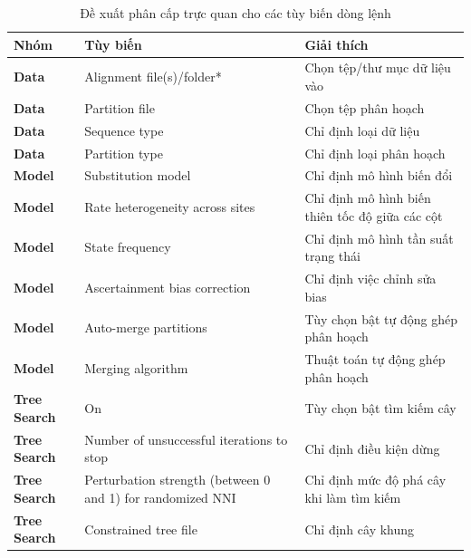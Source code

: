 \documentclass[12pt]{report}
\begin{document}
\begin{longtable}[c]{|p{2.5cm}|p{6.5cm}|p{6.5cm}|}
\caption{Đề xuất phân cấp trực quan cho các tùy biến dòng lệnh}
\label{tbl:table4.1}
\hline
\textbf{Nhóm} & \textbf{Tùy biến} & \textbf{Giải thích} \\
\endfirsthead
%
\endhead
%
\hline
		\textbf{Data}              & Alignment file(s)/folder*        &        Chọn tệp/thư mục dữ liệu vào                          \\ \hline
		\textbf{Data}             & Partition file     &            Chọn tệp phân hoạch             \\ \hline
		\textbf{Data}           & Sequence type    &            Chỉ định loại dữ liệu                      \\ \hline
		\textbf{Data}              & Partition type        &        Chỉ định loại phân hoạch                         \\ \hline
		\textbf{Model}             & Substitution model    &            Chỉ định mô hình biến đổi            \\ \hline
		\textbf{Model}           & Rate heterogeneity across sites   &            Chỉ định mô hình biến thiên tốc độ giữa các cột                     \\ \hline
		\textbf{Model}              & State frequency        &        Chỉ định mô hình tần suất trạng thái                      \\ \hline
		\textbf{Model}             & Ascertainment bias correction    &            Chỉ định việc chỉnh sửa bias            \\ \hline
		\textbf{Model}           & Auto-merge partitions   &            Tùy chọn bật tự động ghép phân hoạch                     \\ \hline
		\textbf{Model}              & Merging algorithm        &        Thuật toán tự động ghép phân hoạch                          \\ \hline
		\textbf{Tree Search}             & On    &            Tùy chọn bật tìm kiếm cây             \\ \hline
		\textbf{Tree Search}           & Number of unsuccessful iterations to stop    &            Chỉ định điều kiện dừng                      \\ \hline
		\textbf{Tree Search}              & Perturbation strength (between 0 and 1) for randomized NNI       &        Chỉ định mức độ phá cây khi làm tìm kiếm                          \\ \hline
		\textbf{Tree Search}             & Constrained tree file    &            Chỉ định cây khung            \\ \hline

\end{longtable}
\end{document}
